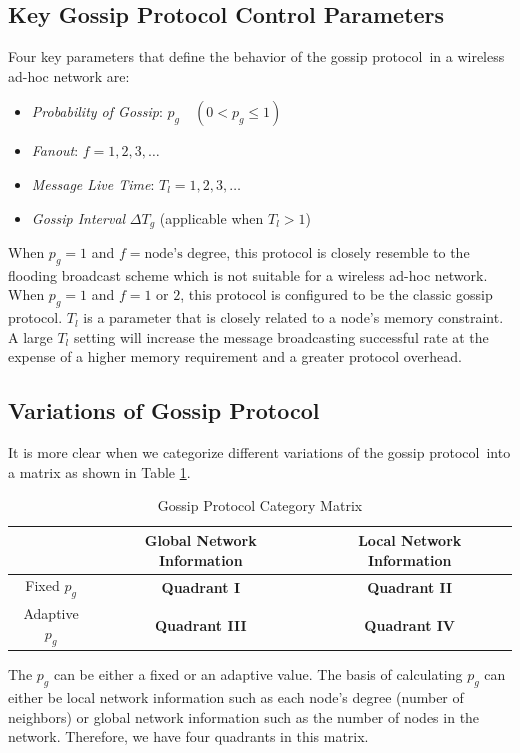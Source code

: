 \documentclass[onehalf,11pt]{beavtex}
\newcommand{\gp}{gossip protocol}
\newcommand{\pog}{Probability of Gossip}
\begin{document}
\subsection{Key Gossip Protocol Control Parameters}
Four key parameters that define the behavior of the \gp ~in a wireless ad-hoc network are: 

\begin{itemize}
	\item \emph{\pog}: $p_g  \quad (0 < p_g \leq 1)$
	\item \emph{Fanout}: $f = 1, 2, 3, \ldots$
	\item \emph{Message Live Time}: $T_l = 1,2,3, \ldots$
	\item \emph{Gossip Interval} $\Delta T_g$ (applicable when $T_l > 1$)
\end{itemize}

When $p_g = 1$ and $f = \mbox{node's degree}$, this protocol is closely resemble to the flooding broadcast scheme which is not suitable for a wireless ad-hoc network. When $p_g = 1$ and $f = 1 \mbox{ or } 2$, this protocol is configured to be the classic \gp. $T_l$ is a parameter that is closely related to a node's memory constraint. A large $T_l$ setting will increase the message broadcasting successful rate at the expense of a higher memory requirement and a greater protocol overhead. 

\subsection{Variations of Gossip Protocol}

It is more clear when we categorize different variations of the \gp ~into a matrix as shown in Table \ref{table:matrix}. 

\begin{table}[h]
	\centering
	\caption{Gossip Protocol Category Matrix}
	\label{table:matrix}
	\centering
	\begin{tabular}{|c|c|c|}
		\hline 
		& Global Network Information & Local Network Information \\ 
		\hline 
		Fixed  $p_g$ & \textbf{Quadrant I} & \textbf{Quadrant II} \\ 
		\hline 
		Adaptive $p_g$ & \textbf{Quadrant III} & \textbf{Quadrant IV} \\ 
		\hline 
	\end{tabular} 
\end{table}

The $p_g$ can be either a fixed or an adaptive value. The basis of calculating $p_g$ can either be local network information such as each node's degree (number of neighbors) or global network information such as the number of nodes in the network. Therefore, we have four quadrants in this matrix. 
\end{document}
